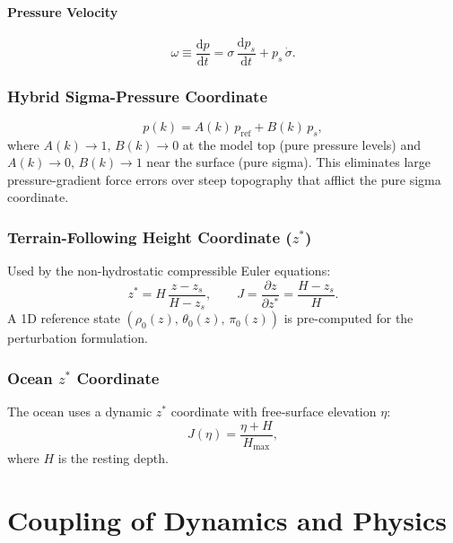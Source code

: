 \documentclass[11pt,twoside]{report}
\newcommand{\dd}{\mathrm{d}}
\newcommand{\pp}{\partial}
\begin{document}
\subsubsection{Pressure Velocity}
\begin{equation}
  \omega \equiv \frac{\dd p}{\dd t}
  = \sigma\,\frac{\dd p_s}{\dd t} + p_s\,\dot\sigma.
\end{equation}

\subsection{Hybrid Sigma-Pressure Coordinate}

\begin{equation}
  p(k) = A(k)\,p_{\mathrm{ref}} + B(k)\,p_s,
\end{equation}
where $A(k)\to 1,\,B(k)\to 0$ at the model top (pure pressure levels)
and $A(k)\to 0,\,B(k)\to 1$ near the surface (pure sigma).
This eliminates large pressure-gradient force errors over steep topography
that afflict the pure sigma coordinate.

\subsection{Terrain-Following Height Coordinate ($z^*$)}

Used by the non-hydrostatic compressible Euler equations:
\begin{equation}
  z^* = H\,\frac{z-z_s}{H-z_s}, \qquad
  J=\frac{\pp z}{\pp z^*}=\frac{H-z_s}{H}.
\end{equation}
A 1D reference state $(\rho_0(z),\,\theta_0(z),\,\pi_0(z))$ is
pre-computed for the perturbation formulation.

\subsection{Ocean $z^*$ Coordinate}

The ocean uses a dynamic $z^*$ coordinate with free-surface elevation $\eta$:
\begin{equation}
  J(\eta) = \frac{\eta+H}{H_{\max}},
\end{equation}
where $H$ is the resting depth.


\chapter{Coupling of Dynamics and Physics}
\label{ch:coupling}
\end{document}
